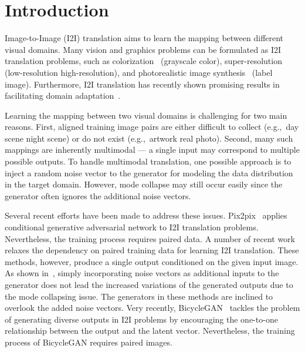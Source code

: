 \documentclass[runningheads]{llncs}
\newlength\secmargin
\def\eg{e.g.,~}
\begin{document}
\vspace{\secmargin}
\section{Introduction}
\label{sec:introduction}
\vspace{\secmargin}
Image-to-Image (I2I) translation aims to learn the mapping between different visual domains. 
Many vision and graphics problems can be formulated as I2I translation problems, such as colorization~\cite{larsson2016colorization,zhang2016colorization2} (grayscale  color), super-resolution~\cite{ledig2016photo,lai2017deep,li2016deep} (low-resolution  high-resolution), and photorealistic image synthesis~\cite{chen2017photographic,wang2017pix2pixhd} (label  image).
Furthermore, I2I translation has recently shown promising results in facilitating domain adaptation~\cite{bousmalis2017unsupervisedda,shrivastava2017apple,hoffman2017cycada,murez2018image}.

Learning the mapping between two visual domains is challenging for two main reasons. 
First, aligned training image pairs are either difficult to collect (\eg day scene  night scene) or do not exist (\eg artwork  real photo).
Second, many such mappings are inherently multimodal --- a single input may correspond to multiple possible outputs.
To handle multimodal translation, one possible approach is to inject a random noise vector to the generator for modeling the data distribution in the target domain. 
However, mode collapse may still occur easily since the generator often ignores the additional noise vectors.

Several recent efforts have been made to address these issues.
{Pix2pix}~\cite{isola2017pix2pix} applies conditional generative adversarial network to I2I translation problems.
Nevertheless, the training process requires paired data.
A number of recent work~\cite{zhu2017cyclegan,liu2017unit,yi2017dualgan,taigman2016unsupervised,choi2017stargan} relaxes the dependency on paired training data for learning I2I translation. 
These methods, however, produce a single output conditioned on the given input image.
As shown in~\cite{isola2017pix2pix,zhu2017bicyclegan}, simply incorporating noise vectors as additional inputs to the generator does not lead the increased variations of the generated outputs due to the mode collapsing issue.
The generators in these methods are inclined to overlook the added noise vectors.
Very recently, {BicycleGAN}~\cite{zhu2017bicyclegan} tackles the problem of generating diverse outputs in I2I problems by encouraging the one-to-one relationship between the output and the latent vector.
Nevertheless, the training process of {BicycleGAN} requires paired images.
\end{document}
